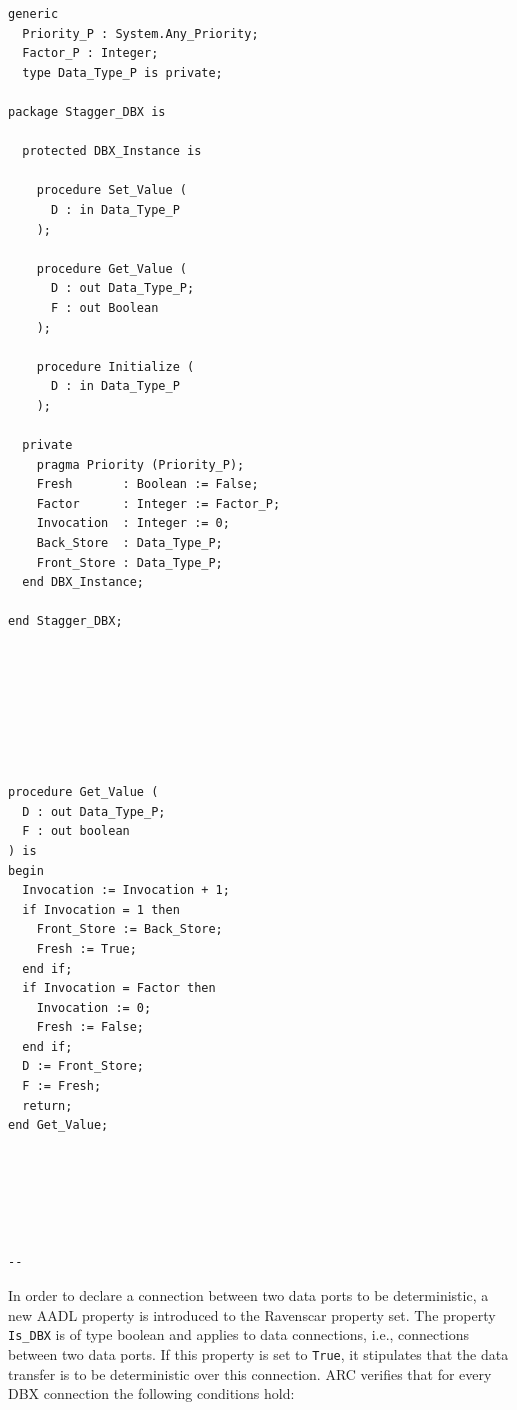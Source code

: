 \begin{minipage}{0.45\linewidth}
\lstset{language=ada}
\begin{lstlisting}[label=lst:stagger_spec, caption=Specification of the Stagger DBX connector]
generic
  Priority_P : System.Any_Priority;
  Factor_P : Integer;
  type Data_Type_P is private;

package Stagger_DBX is

  protected DBX_Instance is
      
    procedure Set_Value (
      D : in Data_Type_P
    );

    procedure Get_Value (
      D : out Data_Type_P; 
      F : out Boolean
    );
    
    procedure Initialize (
      D : in Data_Type_P
    );
  
  private
    pragma Priority (Priority_P);
    Fresh       : Boolean := False;
    Factor      : Integer := Factor_P;
    Invocation  : Integer := 0;
    Back_Store  : Data_Type_P;
    Front_Store : Data_Type_P;
  end DBX_Instance;

end Stagger_DBX;
\end{lstlisting}
\end{minipage}
\hspace{5mm}
\begin{minipage}{0.45\linewidth}
\lstset{language=ada}
\begin{lstlisting}[label=lst:stagger_get, caption=Stagger DBX connector
    \texttt{Get\_Value} procedure]







procedure Get_Value (
  D : out Data_Type_P; 
  F : out boolean
) is
begin
  Invocation := Invocation + 1;
  if Invocation = 1 then
    Front_Store := Back_Store;
    Fresh := True;
  end if;
  if Invocation = Factor then
    Invocation := 0;
    Fresh := False;
  end if;
  D := Front_Store;
  F := Fresh;
  return;
end Get_Value;






--
\end{lstlisting}
\end{minipage}

In order to declare a connection between two data ports to be
deterministic, a new AADL property is introduced to the Ravenscar
property set. The property \texttt{Is\_DBX} is of type boolean and
applies to data connections, i.e., connections between two data
ports. If this property is set to \texttt{True}, it stipulates that
the data transfer is to be deterministic over this connection. ARC
verifies that for every DBX connection the following conditions hold:


